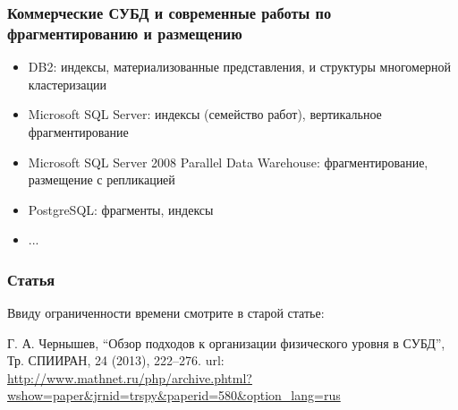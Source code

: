 \documentclass[unicode]{beamer}
\begin{document}
\begin{frame}[fragile]
\frametitle{Коммерческие СУБД и современные работы по фрагментированию и размещению}

\begin{itemize}
    \setlength\itemsep{1em}		
	\item DB2: индексы, материализованные представления, и структуры многомерной кластеризации \cite{p51}
	\item Microsoft SQL Server: индексы (семейство работ), вертикальное фрагментирование \cite{p55}
	\item Microsoft SQL Server 2008 Parallel Data Warehouse: фрагментирование, размещение с репликацией \cite{p54}
	\item PostgreSQL: фрагменты, индексы \cite{p56, p57, p58}
	\item ...
\end{itemize}

\end{frame}

\begin{frame}
\frametitle{Статья}

Ввиду ограниченности времени смотрите в старой статье:

\begin{block}{}
	Г. А. Чернышев, ``Обзор подходов к организации физического уровня в СУБД'', Тр. СПИИРАН, 24 (2013), 222--276. url: \url{http://www.mathnet.ru/php/archive.phtml?wshow=paper&jrnid=trspy&paperid=580&option_lang=rus}
\end{block}{}

\end{frame}
\end{document}
